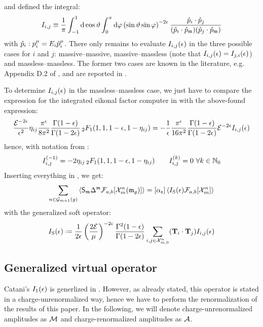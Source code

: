 and defined the integral:
\begin{equation}
  I_{i,j} \equiv \frac{1}{\pi} \int_{-1}^1 \mathrm{d} \cos \vartheta \int_0^\pi \mathrm{d} \varphi \left( \sin \vartheta \sin \varphi \right)^{-2\epsilon} \frac{\hat{p}_i \cdot \hat{p}_j}{(\hat{p}_i \cdot \hat{p}_{\mathfrak{m}}) (\hat{p}_j \cdot \hat{p}_{\mathfrak{m}})}
  \label{eq:gen-int}
\end{equation}
with $ \hat{p}_i : p_i^\mu = E_i \hat{p}_i^\mu $. There only remains to evaluate $ I_{i,j}(\epsilon) $ in the three possible cases for $ i $ and $ j $: massive--massive, massive--massless (note that $ I_{i,j}(\epsilon) = I_{j,i}(\epsilon) $) and massless--massless. The former two cases are known in the literature, e.g. Appendix D.2 of \cite{Behring-2020}, and are reported in .

To determine $ I_{i,j}(\epsilon) $ in the massless--massless case, we just have to compare the expression for the integrated eikonal factor computer in  with the above-found expression:
\begin{equation*}
  \frac{\mathcal{E}^{-2\epsilon}}{\epsilon^2} \eta_{ij} \frac{\pi^\epsilon}{8\pi^2} \frac{\Gamma(1-\epsilon)}{\Gamma(1-2\epsilon)} \,{_2F_1}(1,1,1-\epsilon,1-\eta_{ij}) = - \frac{1}{\epsilon} \frac{\pi^\epsilon}{16\pi^2} \frac{\Gamma(1-\epsilon)}{\Gamma(1-2\epsilon)} \mathcal{E}^{-2\epsilon} I_{i,j}(\epsilon)
\end{equation*}
hence, with notation from :
\begin{equation}
  I_{i,j}^{(-1)} = - 2 \eta_{ij} \,{_2F_1}(1,1,1-\epsilon,1-\eta_{ij})
  \qquad
  I_{i,j}^{(k)} = 0 \,\,\forall k \in \mathbb{N}_0
  \label{eq:i-nmnm}
\end{equation}
Inserting everything in , we get:
\begin{equation}
  \sum_{n \in \mathcal{G}_{m+1}(g)} \left\langle \mathsf{S}_{\mathfrak{m}} \Delta^{\mathfrak{m}} \mathcal{F}_{a,b}[\mathcal{X}^{n}_{m}(\mathfrak{m}_g)] \right\rangle = [\alpha_\text{s}] \left\langle I_\text{S}(\epsilon) \mathcal{F}_{a,b}[\mathcal{X}^{n}_{m}] \right\rangle
\end{equation}
with the generalized soft operator:
\begin{equation}
  \iso(\de) \defeq \frac{1}{2\de} \left( \frac{2\ema}{\mu} \right)^{-2\de} \frac{\Gamma^2(1-\de)}{\Gamma(1-2\de)} \sum_{i,j \in \fsp{n}{m}} (\cc) \eit_{i,j}(\de)
\end{equation}

\subsection{Generalized virtual operator}

Catani's $ I_1(\epsilon) $ is generlized in \cite{Catani-2001}. However, as already stated, this operator is stated in a charge-unrenormalized way, hence we have to perform the renormalization of the results of this paper. In the following, we will denote charge-unrenormalized amplitudes as $ \mathcal{M} $ and charge-renormalized amplitudes as $ \mathcal{A} $.

